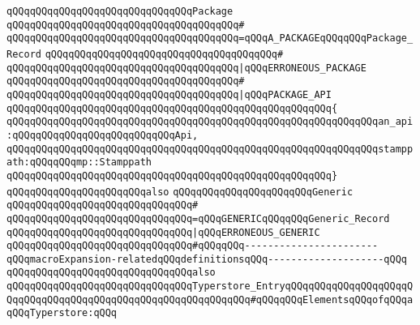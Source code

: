 \verb|qQQqqQQqqQQqqQQqqQQqqQQqqQQqqQQqPackage|\newline
\verb|qQQqqQQqqQQqqQQqqQQqqQQqqQQqqQQqqQQqqQQq#|\newline
\verb|qQQqqQQqqQQqqQQqqQQqqQQqqQQqqQQqqQQqqQQq=qQQqA_PACKAGEqQQqqQQqPackage_Record|\newline
\verb|qQQqqQQqqQQqqQQqqQQqqQQqqQQqqQQqqQQqqQQq#|\newline
\verb|qQQqqQQqqQQqqQQqqQQqqQQqqQQqqQQqqQQqqQQq|\verb#|qQQqERRONEOUS_PACKAGE#\newline
\verb|qQQqqQQqqQQqqQQqqQQqqQQqqQQqqQQqqQQqqQQq#|\newline
\verb|qQQqqQQqqQQqqQQqqQQqqQQqqQQqqQQqqQQqqQQq|\verb#|qQQqPACKAGE_API#\newline
\verb|qQQqqQQqqQQqqQQqqQQqqQQqqQQqqQQqqQQqqQQqqQQqqQQqqQQqqQQq{|\newline
\verb|qQQqqQQqqQQqqQQqqQQqqQQqqQQqqQQqqQQqqQQqqQQqqQQqqQQqqQQqqQQqqQQqan_api:qQQqqQQqqQQqqQQqqQQqqQQqqQQqApi,|\newline
\verb|qQQqqQQqqQQqqQQqqQQqqQQqqQQqqQQqqQQqqQQqqQQqqQQqqQQqqQQqqQQqqQQqstamppath:qQQqqQQqmp::Stamppath|\newline
\verb|qQQqqQQqqQQqqQQqqQQqqQQqqQQqqQQqqQQqqQQqqQQqqQQqqQQqqQQq}|\newline
\newline
\newline
\newline
\verb|qQQqqQQqqQQqqQQqqQQqqQQqalso|\newline
\verb|qQQqqQQqqQQqqQQqqQQqqQQqGeneric|\newline
\verb|qQQqqQQqqQQqqQQqqQQqqQQqqQQqqQQq#|\newline
\verb|qQQqqQQqqQQqqQQqqQQqqQQqqQQqqQQq=qQQqGENERICqQQqqQQqGeneric_Record|\newline
\verb|qQQqqQQqqQQqqQQqqQQqqQQqqQQqqQQq|\verb#|qQQqERRONEOUS_GENERIC#\newline
\newline
\newline
\newline
\verb|qQQqqQQqqQQqqQQqqQQqqQQqqQQqqQQq#qQQqqQQq-----------------------qQQqmacroExpansion-relatedqQQqdefinitionsqQQq--------------------qQQq|\newline
\newline
\verb|qQQqqQQqqQQqqQQqqQQqqQQqqQQqqQQqalso|\newline
\verb|qQQqqQQqqQQqqQQqqQQqqQQqqQQqqQQqTyperstore_EntryqQQqqQQqqQQqqQQqqQQqqQQqqQQqqQQqqQQqqQQqqQQqqQQqqQQqqQQqqQQqqQQq#qQQqqQQqElementsqQQqofqQQqaqQQqTyperstore:qQQq|\newline
